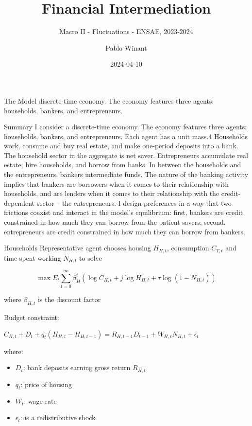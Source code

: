 \documentclass[
  ignorenonframetext,
]{beamer}
\title{Financial Intermediation}
\subtitle{Macro II - Fluctuations - ENSAE, 2023-2024}
\author{Pablo Winant}
\date{2024-04-10}
\providecommand{\tightlist}{%
  \setlength{\itemsep}{0pt}\setlength{\parskip}{0pt}}\usepackage{longtable,booktabs,array}
\begin{document}
\frame{\titlepage}

\begin{frame}{The Model}
\label{the-model}
discrete-time economy. The economy features three agents: households,
bankers, and entrepreneurs.

\begin{block}{Summary}
\label{summary}
I consider a discrete-time economy. The economy features three agents:
households, bankers, and entrepreneurs. Each agent has a unit mass.4
Households work, consume and buy real estate, and make one-period
deposits into a bank. The household sector in the aggregate is net
saver. Entrepreneurs accumulate real estate, hire households, and borrow
from banks. In between the households and the entrepreneurs, bankers
intermediate funds. The nature of the banking activity implies that
bankers are borrowers when it comes to their relationship with
households, and are lenders when it comes to their relationship with the
credit-dependent sector -- the entrepreneurs. I design preferences in a
way that two frictions coexist and interact in the model's equilibrium:
first, bankers are credit constrained in how much they can borrow from
the patient savers; second, entrepreneurs are credit constrained in how
much they can borrow from bankers.
\end{block}

\begin{block}{Households}
\label{households}
Representative agent chooses housing \(H_{H,t}\), consumption
\(C_{T,t}\) and time spent working \(N_{H,t}\) to solve

\[\max E_t \sum_{t=0}^{\infty} \beta^t_H \left( \log C_{H,t} + j \log H_{H,t} + \tau \log(1-N_{H,t}) \right)\]

where \(\beta_{H,t}\) is the discount factor

\pause

Budget constraint:

\(C_{H,t} + D_t + q_t \left( H_{H,t}- H_{H,t-1} \right) = R_{H,t-1} D_{t-1} + W_{H,t} N_{H,t} + \epsilon_t\)

where:

\begin{itemize}
\tightlist
\item
  \(D_t\): bank deposits earning gross return \(R_{H,t}\)
\item
  \(q_t\): price of housing
\item
  \(W_t\): wage rate
\item
  \(\epsilon_t\): is a redistributive shock
\end{itemize}
\end{block}


\end{frame}
\end{document}
